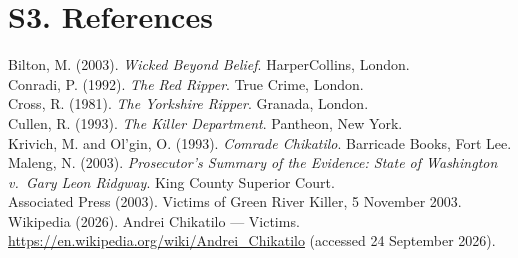 \documentclass[11pt,a4paper]{article}
\begin{document}
\section*{S3. References}
Bilton, M. (2003). \textit{Wicked Beyond Belief}. HarperCollins, London.\\
Conradi, P. (1992). \textit{The Red Ripper}. True Crime, London.\\
Cross, R. (1981). \textit{The Yorkshire Ripper}. Granada, London.\\
Cullen, R. (1993). \textit{The Killer Department}. Pantheon, New York.\\
Krivich, M. and Ol'gin, O. (1993). \textit{Comrade Chikatilo}. Barricade Books, Fort Lee.\\
Maleng, N. (2003). \textit{Prosecutor's Summary of the Evidence: State of Washington v.\ Gary Leon Ridgway}. King County Superior Court.\\
Associated Press (2003). Victims of Green River Killer, 5 November 2003.\\
Wikipedia (2026). Andrei Chikatilo --- Victims. \url{https://en.wikipedia.org/wiki/Andrei_Chikatilo} (accessed 24 September 2026).
\end{document}
